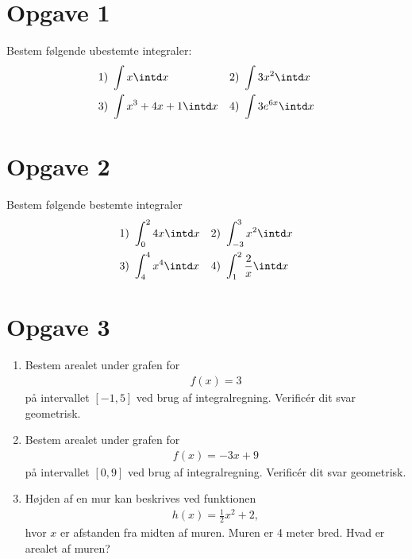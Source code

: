 \section*{Opgave 1}
Bestem følgende ubestemte integraler:
\begin{align*}
&1)   \ \int x \intd x    &&2) \ \int 3x^2 \intd x     \\
&3)   \ \int x^3 + 4x + 1 \intd x  &&4) \ \int 3e^{6x} \intd x     \\
\end{align*}
\section*{Opgave 2}
Bestem følgende bestemte integraler
\begin{align*}
&1) \ \int_0^2 4x \intd x   &&2) \ \int_{-3}^3 x^2\intd x    \\
&3) \ \int_4^4 x^4 \intd x  &&4) \ \int_1^2 \frac{2}{x} \intd x    \\
\end{align*}

\section*{Opgave 3}
	\begin{enumerate}[label=\roman*)]
		\item Bestem arealet under grafen for
			\begin{align*}
				f(x) = 3
			\end{align*}
			på intervallet $[-1,5]$ ved brug af integralregning. Verificér dit svar geometrisk.
		\item Bestem arealet under grafen for
			\begin{align*}
				f(x) = -3x + 9
			\end{align*}
			på intervallet $[0,9]$ ved brug af integralregning. Verificér dit svar geometrisk.
		\item Højden af en mur kan beskrives ved funktionen
			\begin{align*}
				h(x) = \frac{1}{2}x^2 + 2,
			\end{align*}
			hvor $x$ er afstanden fra midten af muren. Muren er 4 meter bred. Hvad er arealet af muren?		
	\end{enumerate}

